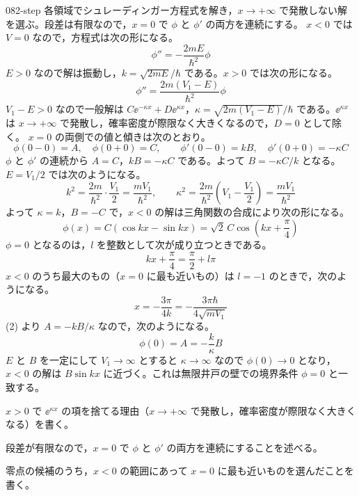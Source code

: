 \documentclass[uplatex,dvipdfmx,a4paper,11pt]{jsarticle}
\begin{document}
\begin{kaisetsu}{082-step}
\houshin 各領域でシュレーディンガー方程式を解き，$x\to+\infty$ で発散しない解を選ぶ。段差は有限なので，$x=0$ で $\phi$ と $\phi'$ の両方を連続にする。
\keisan
{} $x<0$ では $V=0$ なので，方程式は次の形になる。
\[ \phi''=-\frac{2mE}{\hbar^{2}}\phi \]
$E>0$ なので解は振動し，$k=\sqrt{2mE}/\hbar$ である。$x>0$ では次の形になる。
\[ \phi''=\frac{2m(V_{1}-E)}{\hbar^{2}}\phi \]
$V_{1}-E>0$ なので一般解は $C\ee^{-\kappa x}+D\ee^{\kappa x}$，$\kappa=\sqrt{2m(V_{1}-E)}/\hbar$ である。$\ee^{\kappa x}$ は $x\to+\infty$ で発散し，確率密度が際限なく大きくなるので，$D=0$ として除く。
 $x=0$ の両側での値と傾きは次のとおり。
\[ \phi(0-0)=A,\quad \phi(0+0)=C,\qquad \phi'(0-0)=kB,\quad \phi'(0+0)=-\kappa C \]
$\phi$ と $\phi'$ の連続から $A=C$，$kB=-\kappa C$ である。よって $B=-\kappa C/k$ となる。
 $E=V_{1}/2$ では次のようになる。
\[ k^{2}=\frac{2m}{\hbar^{2}}\cdot\frac{V_{1}}{2}=\frac{mV_{1}}{\hbar^{2}},\qquad \kappa^{2}=\frac{2m}{\hbar^{2}}\left(V_{1}-\frac{V_{1}}{2}\right)=\frac{mV_{1}}{\hbar^{2}} \]
よって $\kappa=k$，$B=-C$ で，$x<0$ の解は三角関数の合成により次の形になる。
\[ \phi(x)=C(\cos kx-\sin kx)=\sqrt{2}\,C\cos\left(kx+\frac{\pi}{4}\right) \]
$\phi=0$ となるのは，$l$ を整数として次が成り立つときである。
\[ kx+\frac{\pi}{4}=\frac{\pi}{2}+l\pi \]
$x<0$ のうち最大のもの（$x=0$ に最も近いもの）は $l=-1$ のときで，次のようになる。
\[ x=-\frac{3\pi}{4k}=-\frac{3\pi\hbar}{4\sqrt{mV_{1}}} \]
 (2) より $A=-kB/\kappa$ なので，次のようになる。
\[ \phi(0)=A=-\frac{k}{\kappa}B \]
$E$ と $B$ を一定にして $V_{1}\to\infty$ とすると $\kappa\to\infty$ なので $\phi(0)\to 0$ となり，$x<0$ の解は $B\sin kx$ に近づく。これは無限井戸の壁での境界条件 $\phi=0$ と一致する。
\begin{ronten}
  \item {} $x>0$ で $\ee^{\kappa x}$ の項を捨てる理由（$x\to+\infty$ で発散し，確率密度が際限なく大きくなる）を書く。
  \item {} 段差が有限なので，$x=0$ で $\phi$ と $\phi'$ の両方を連続にすることを述べる。
  \item {} 零点の候補のうち，$x<0$ の範囲にあって $x=0$ に最も近いものを選んだことを書く。

\end{ronten}
\end{kaisetsu}
\end{document}
